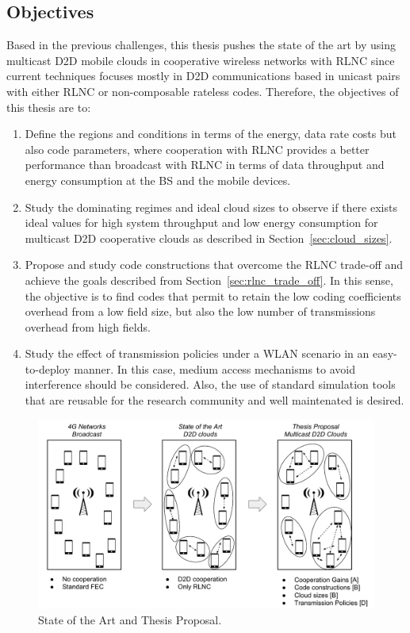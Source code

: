 \subsection{Objectives}
Based in the previous challenges, this thesis pushes the state of the art by using multicast \ac{D2D} mobile clouds in cooperative wireless networks with \ac{RLNC} since current techniques focuses mostly in \ac{D2D} communications based in unicast pairs with either \ac{RLNC} or non-composable rateless codes. Therefore, the objectives of this thesis are to:

\begin{enumerate}

\item Define the regions and conditions in terms of the energy, data rate costs but also code parameters, where cooperation with \ac{RLNC} provides a better performance than broadcast with \ac{RLNC} in terms of data throughput and energy consumption at the \ac{BS} and the mobile devices.

\item Study the dominating regimes and ideal cloud sizes to observe if there exists ideal values for high system throughput and low energy consumption for multicast \ac{D2D} cooperative clouds as described in Section~\ref{sec:cloud_sizes}.

\item Propose and study code constructions that overcome the \ac{RLNC} trade-off and achieve the goals described from Section~\ref{sec:rlnc_trade_off}. In this sense, the objective is to find codes that permit to retain the low coding coefficients overhead from a low field size, but also the low number of transmissions overhead from high fields.

\item Study the effect of transmission policies under a \ac{WLAN} scenario in an easy-to-deploy manner. In this case, medium access mechanisms to avoid interference should be considered. Also, the use of standard simulation tools that are reusable for the research community and well maintenated is desired.

\end{enumerate}

\begin{figure}[h]
  \centering
  \includegraphics[width=\textwidth]{introduction/figures/thesis-diagrams.pdf}
  \caption{State of the Art and Thesis Proposal.}
\label{fig:proposal}
\end{figure}

